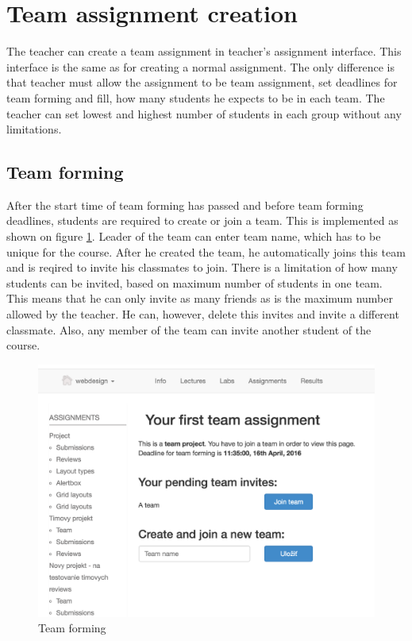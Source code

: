 \section{Team assignment creation}
The teacher can create a team assignment in teacher's assignment interface. This interface is the same as for creating a normal assignment. The only difference is that teacher must allow the assignment to be team assignment, set deadlines for team forming and fill, how many students he expects to be in each team. The teacher can set lowest and highest number of students in each group without any limitations.

\subsection{Team forming}
After the start time of team forming has passed and before team forming deadlines, students are required to create or join a team. This is implemented as shown on figure \ref{team_forming}. Leader of the team can enter team name, which has to be unique for the course. After he created the team, he automatically joins this team and is reqired to invite his classmates to join. There is a limitation of how many students can be invited, based on maximum number of students in one team. This means that he can only invite as many friends as is the maximum number allowed by the teacher. He can, however, delete this invites and invite a different classmate. Also, any member of the team can invite another student of the course.

\begin{figure}[h]
    \centering
    \includegraphics[width=\textwidth]{images/teamforming.png}
    \caption{Team forming}
    \label{team_forming}
\end{figure}

